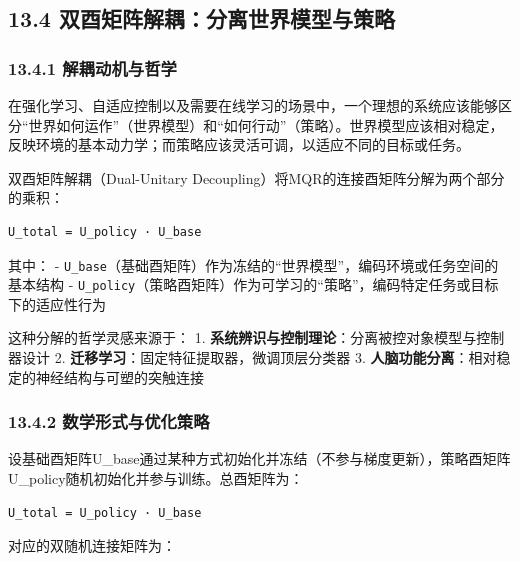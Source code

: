 \documentclass[
  12pt,
]{article}
\begin{document}
\hypertarget{ux53ccux9149ux77e9ux9635ux89e3ux8026ux5206ux79bbux4e16ux754cux6a21ux578bux4e0eux7b56ux7565}{%
\subsection{13.4
双酉矩阵解耦：分离世界模型与策略}\label{ux53ccux9149ux77e9ux9635ux89e3ux8026ux5206ux79bbux4e16ux754cux6a21ux578bux4e0eux7b56ux7565}}

\hypertarget{ux89e3ux8026ux52a8ux673aux4e0eux54f2ux5b66}{%
\subsubsection{13.4.1
解耦动机与哲学}\label{ux89e3ux8026ux52a8ux673aux4e0eux54f2ux5b66}}

在强化学习、自适应控制以及需要在线学习的场景中，一个理想的系统应该能够区分``世界如何运作''（世界模型）和``如何行动''（策略）。世界模型应该相对稳定，反映环境的基本动力学；而策略应该灵活可调，以适应不同的目标或任务。

双酉矩阵解耦（Dual-Unitary
Decoupling）将MQR的连接酉矩阵分解为两个部分的乘积：

\begin{verbatim}
U_total = U_policy · U_base
\end{verbatim}

其中： -
\texttt{U\_base}（基础酉矩阵）作为冻结的``世界模型''，编码环境或任务空间的基本结构
-
\texttt{U\_policy}（策略酉矩阵）作为可学习的``策略''，编码特定任务或目标下的适应性行为

这种分解的哲学灵感来源于： 1.
\textbf{系统辨识与控制理论}：分离被控对象模型与控制器设计 2.
\textbf{迁移学习}：固定特征提取器，微调顶层分类器 3.
\textbf{人脑功能分离}：相对稳定的神经结构与可塑的突触连接

\hypertarget{ux6570ux5b66ux5f62ux5f0fux4e0eux4f18ux5316ux7b56ux7565}{%
\subsubsection{13.4.2
数学形式与优化策略}\label{ux6570ux5b66ux5f62ux5f0fux4e0eux4f18ux5316ux7b56ux7565}}

设基础酉矩阵U\_base通过某种方式初始化并冻结（不参与梯度更新），策略酉矩阵U\_policy随机初始化并参与训练。总酉矩阵为：

\begin{verbatim}
U_total = U_policy · U_base
\end{verbatim}

对应的双随机连接矩阵为：
\end{document}
